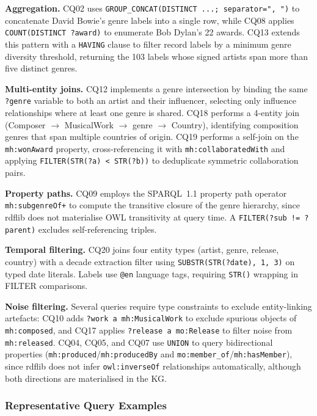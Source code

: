 \textbf{Aggregation.} CQ02 uses \texttt{GROUP\_CONCAT(DISTINCT ...; separator=", ")} to concatenate David Bowie's genre labels into a single row, while CQ08 applies \texttt{COUNT(DISTINCT ?award)} to enumerate Bob Dylan's 22 awards. CQ13 extends this pattern with a \texttt{HAVING} clause to filter record labels by a minimum genre diversity threshold, returning the 103 labels whose signed artists span more than five distinct genres.

\textbf{Multi-entity joins.} CQ12 implements a genre intersection by binding the same \texttt{?genre} variable to both an artist and their influencer, selecting only influence relationships where at least one genre is shared. CQ18 performs a 4-entity join (Composer $\rightarrow$ MusicalWork $\rightarrow$ genre $\rightarrow$ Country), identifying composition genres that span multiple countries of origin. CQ19 performs a self-join on the \texttt{mh:wonAward} property, cross-referencing it with \texttt{mh:collaboratedWith} and applying \texttt{FILTER(STR(?a) < STR(?b))} to deduplicate symmetric collaboration pairs.

\textbf{Property paths.} CQ09 employs the SPARQL~1.1 property path operator \texttt{mh:subgenreOf+} to compute the transitive closure of the genre hierarchy, since rdflib does not materialise OWL transitivity at query time. A \texttt{FILTER(?sub != ?parent)} excludes self-referencing triples.

\textbf{Temporal filtering.} CQ20 joins four entity types (artist, genre, release, country) with a decade extraction filter using \texttt{SUBSTR(STR(?date), 1, 3)} on typed date literals. Labels use \texttt{@en} language tags, requiring \texttt{STR()} wrapping in FILTER comparisons.

\textbf{Noise filtering.} Several queries require type constraints to exclude entity-linking artefacts: CQ10 adds \texttt{?work a mh:MusicalWork} to exclude spurious objects of \texttt{mh:composed}, and CQ17 applies \texttt{?release a mo:Release} to filter noise from \texttt{mh:released}. CQ04, CQ05, and CQ07 use \texttt{UNION} to query bidirectional properties (\texttt{mh:produced}/\texttt{mh:producedBy} and \texttt{mo:member\_of}/\texttt{mh:hasMember}), since rdflib does not infer \texttt{owl:inverseOf} relationships automatically, although both directions are materialised in the KG.

\subsubsection{Representative Query Examples}

